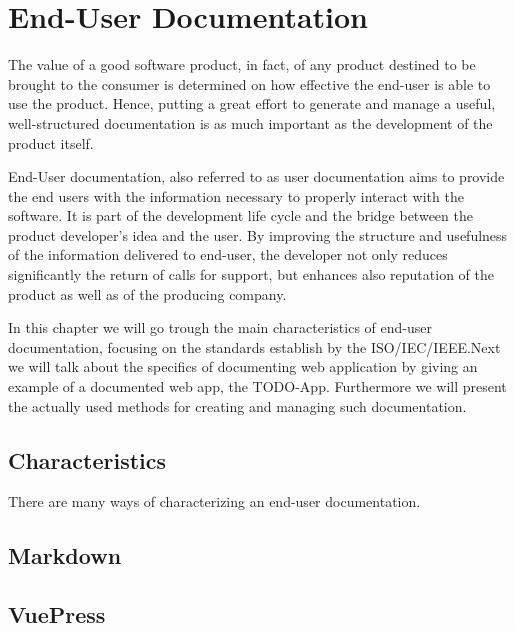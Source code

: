 \chapter{End-User Documentation}\label{ch:userDoc}
The value of a good software product, in fact, of any product destined to be brought to the consumer is determined on how effective the end-user is able to use the product. Hence, putting a great effort to generate and manage a useful, well-structured documentation is as much important as the development of the product itself. 

End-User documentation, also referred to as user documentation aims to provide the end users with the information necessary to properly interact with the software. It is part of the development life cycle and the bridge between the product developer's idea and the user. By improving the structure and usefulness of the information delivered to end-user, the developer not only reduces significantly the return of calls for support, but enhances also reputation of the product as well as of the producing company\cite{8584518}.

In this chapter we will go trough the main characteristics of end-user documentation, focusing on the standards establish by the ISO/IEC/IEEE.\@ Next we will talk about the specifics of documenting web application by giving an example of a documented web app, the TODO-App. Furthermore we will present the actually used methods for creating and managing such documentation.
\section{Characteristics}\label{sec:char}
There are many ways of characterizing an end-user documentation.
\section{Markdown}\label{sec:MD}
\section{VuePress}\label{sec:VP}